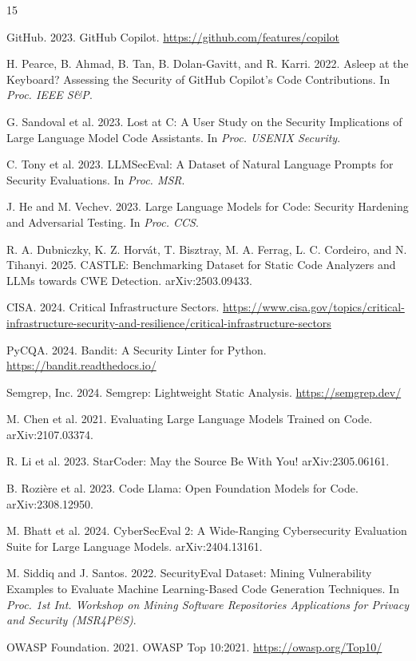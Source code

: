 \documentclass[sigconf,review,anonymous]{acmart}
\begin{document}

\begin{thebibliography}{15}

GitHub. 2023. GitHub Copilot. \url{https://github.com/features/copilot}

H. Pearce, B. Ahmad, B. Tan, B. Dolan-Gavitt, and R. Karri. 2022. Asleep at the Keyboard? Assessing the Security of GitHub Copilot's Code Contributions. In \textit{Proc. IEEE S\&P}.

G. Sandoval et al. 2023. Lost at C: A User Study on the Security Implications of Large Language Model Code Assistants. In \textit{Proc. USENIX Security}.

C. Tony et al. 2023. LLMSecEval: A Dataset of Natural Language Prompts for Security Evaluations. In \textit{Proc. MSR}.

J. He and M. Vechev. 2023. Large Language Models for Code: Security Hardening and Adversarial Testing. In \textit{Proc. CCS}.

R. A. Dubniczky, K. Z. Horv\'at, T. Bisztray, M. A. Ferrag, L. C. Cordeiro, and N. Tihanyi. 2025. CASTLE: Benchmarking Dataset for Static Code Analyzers and LLMs towards CWE Detection. arXiv:2503.09433.

CISA. 2024. Critical Infrastructure Sectors. \url{https://www.cisa.gov/topics/critical-infrastructure-security-and-resilience/critical-infrastructure-sectors}

PyCQA. 2024. Bandit: A Security Linter for Python. \url{https://bandit.readthedocs.io/}

Semgrep, Inc. 2024. Semgrep: Lightweight Static Analysis. \url{https://semgrep.dev/}

M. Chen et al. 2021. Evaluating Large Language Models Trained on Code. arXiv:2107.03374.

R. Li et al. 2023. StarCoder: May the Source Be With You! arXiv:2305.06161.

B. Rozi\`ere et al. 2023. Code Llama: Open Foundation Models for Code. arXiv:2308.12950.

M. Bhatt et al. 2024. CyberSecEval 2: A Wide-Ranging Cybersecurity Evaluation Suite for Large Language Models. arXiv:2404.13161.

M. Siddiq and J. Santos. 2022. SecurityEval Dataset: Mining Vulnerability Examples to Evaluate Machine Learning-Based Code Generation Techniques. In \textit{Proc. 1st Int. Workshop on Mining Software Repositories Applications for Privacy and Security (MSR4P\&S)}.

OWASP Foundation. 2021. OWASP Top 10:2021. \url{https://owasp.org/Top10/}

\end{thebibliography}
\end{document}
